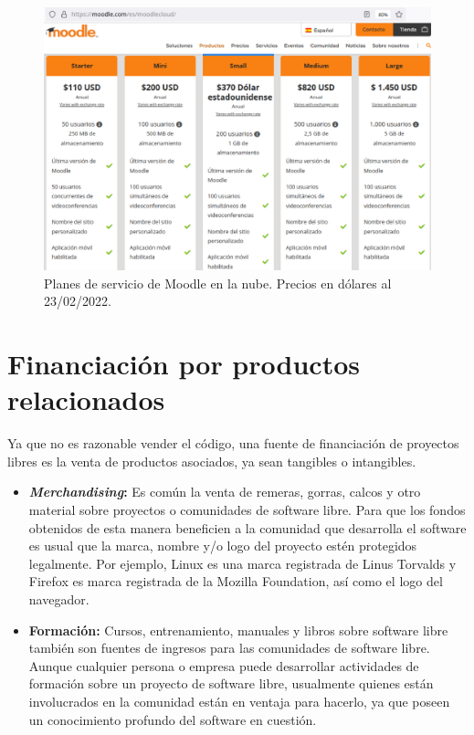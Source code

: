 \begin{figure}[h!]
\centering
\includegraphics[scale=.5]{imagenes/moodle.eps}
\caption{Planes de servicio de Moodle en la nube. Precios en dólares al 23/02/2022.}
\label{figMoodle}
\end{figure}


\section{Financiación por productos relacionados}

Ya que no es razonable vender el código, una fuente de financiación de proyectos libres es la venta de productos asociados, ya sean tangibles o intangibles.

\begin{itemize}
\item {\bf \emph{Merchandising}:} Es común la venta de remeras, gorras, calcos y otro material sobre proyectos o comunidades de software libre. Para que los fondos obtenidos de esta manera beneficien a la comunidad que desarrolla el software es usual que la marca, nombre y/o logo del proyecto estén protegidos legalmente. Por ejemplo, Linux es una marca registrada de Linus Torvalds y Firefox es marca registrada de la Mozilla Foundation, así como el logo del navegador.

\item {\bf Formación:} Cursos, entrenamiento, manuales y libros sobre software libre también son fuentes de ingresos para las comunidades de software libre. Aunque cualquier persona o empresa puede desarrollar actividades de formación sobre un proyecto de software libre, usualmente quienes están involucrados en la comunidad están en ventaja para hacerlo, ya que poseen un conocimiento profundo del software en cuestión.
 
\end{itemize}

